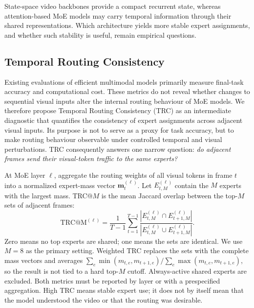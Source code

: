 \documentclass[10pt]{article}
\newenvironment{reviewchange}{\begingroup\color{red}}{\endgroup}
\begin{document}
State-space video backbones provide a compact recurrent state, whereas attention-based
MoE models may carry temporal information through their shared representations.  Which
architecture yields more stable expert assignments, and whether such stability is
useful, remain empirical questions.

\begin{reviewchange}
\subsection{Temporal Routing Consistency}
\label{sec:trc}

Existing evaluations of efficient multimodal models primarily measure final-task
accuracy and computational cost.  These metrics do not reveal whether changes to
sequential visual inputs alter the internal routing behaviour of MoE models.  We
therefore propose Temporal Routing Consistency (TRC) as an intermediate diagnostic
that quantifies the consistency of expert assignments across adjacent visual inputs.
Its purpose is not to serve as a proxy for task accuracy, but to make routing behaviour
observable under controlled temporal and visual perturbations.  TRC consequently
answers one narrow question: \emph{do adjacent frames send their visual-token traffic
to the same experts?}

At MoE layer $\ell$, aggregate the routing weights of all visual tokens in frame $t$
into a normalized expert-mass vector $\mathbf{m}_t^{(\ell)}$.  Let
$E_{t,M}^{(\ell)}$ contain the $M$ experts with the largest mass.  TRC@$M$ is the mean
Jaccard overlap between the top-$M$ sets of adjacent frames:
\begin{equation}
  \mathrm{TRC@M}^{(\ell)}
  = \frac{1}{T-1}\sum_{t=1}^{T-1}
  \frac{\left|E_{t,M}^{(\ell)} \cap E_{t+1,M}^{(\ell)}\right|}
       {\left|E_{t,M}^{(\ell)} \cup E_{t+1,M}^{(\ell)}\right|}.
  \label{eq:trc}
\end{equation}
Zero means no top experts are shared; one means the sets are identical.  We use
$M=8$ as the primary setting.  Weighted TRC replaces the sets with the complete mass
vectors and averages $\sum_e\min(m_{t,e},m_{t+1,e})/\sum_e\max(m_{t,e},m_{t+1,e})$,
so the result is not tied to a hard top-$M$ cutoff.  Always-active shared experts are
excluded.  Both metrics must be reported by layer or with a prespecified aggregation.
High TRC means stable expert use; it does not by itself mean that the model understood
the video or that the routing was desirable.

\begin{reviewchange}

\end{reviewchange}
\end{reviewchange}
\end{document}
